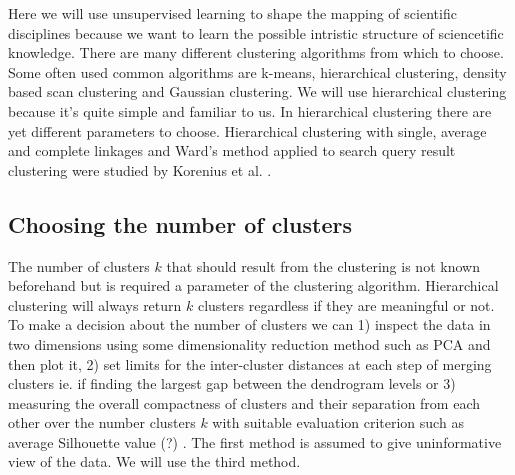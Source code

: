 Here we will use unsupervised learning to shape the mapping of 
scientific disciplines because we want to learn the possible 
intristic structure of sciencetific knowledge.  
There are many different clustering algorithms from which to 
choose. Some often used common algorithms are k-means, hierarchical
clustering, density based scan clustering and Gaussian clustering.
We will use hierarchical clustering because it's quite simple and 
familiar to us.
In hierarchical clustering there are yet different parameters to 
choose. 
Hierarchical clustering with single, average and complete linkages
and Ward's method applied to search query result clustering were 
studied by Korenius et al. \cite{korenius_hierarchical_2006}.

\subsection{Choosing the number of clusters}
The number of clusters $k$ that should result from the clustering is
not known beforehand but is required a parameter of the
clustering algorithm. Hierarchical clustering will always return 
$k$ clusters regardless if they are meaningful or not. To make a
decision about the number of clusters we can 1) inspect the data in 
two dimensions using some dimensionality reduction method such as 
PCA and then plot it, 2) set limits for the inter-cluster 
distances at each step of merging clusters ie. if finding the 
largest gap between the dendrogram levels or 3) measuring the 
overall compactness of clusters and their separation from each 
other over the number clusters $k$ with suitable evaluation 
criterion such as average Silhouette value 
\cite{alpaydin2004introduction} \cite{calinski_dendrite_1974}(?) 
\cite{rousseeuw_silhouettes:_1987}. The first method is assumed to 
give uninformative view of the data. We will use the third method.





